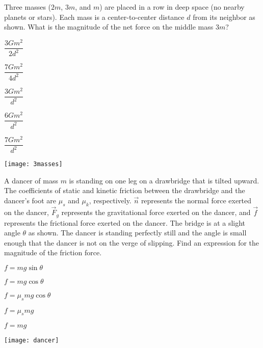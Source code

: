 \documentclass[11pt]{article}
\begin{document}
\begin{enumerate}
\begin{minipage}[t]{\lw}
\item Three masses ($2m$, $3m$, and $m$) are placed in a row in deep space (no nearby planets or stars). Each mass is a center-to-center distance $d$ from its neighbor as shown. What is the magnitude of the net force on the middle mass $3m$?\\
\begin{minipage}[t]{.5\lw}
\begin{choices}
\item $\dfrac{3Gm^2}{2d^2}$
\item $\dfrac{7Gm^2}{4d^2}$
\item $\dfrac{3Gm^2}{d^2}$
\item $\dfrac{6Gm^2}{d^2}$
\item $\dfrac{7Gm^2}{d^2}$
\end{choices}
\end{minipage}\hfill
\begin{minipage}[t]{.45\lw}
\vspace{0in}
\flushright
\texttt{[image: 3masses]}
\end{minipage}
\end{minipage}

\begin{minipage}[t]{\lw}
\item A dancer of mass $m$ is standing on one leg on a drawbridge that is tilted upward. The coefficients of static and kinetic friction between the drawbridge and the dancer's foot are $\mu_s$ and $\mu_k$, respectively. $\vec{n}$ represents the normal force exerted on the dancer, $\vec{F}_g$ represents the gravitational force exerted on the dancer, and $\vec{f}$ represents the frictional force exerted on the dancer. The bridge is at a slight angle $\theta$ as shown. The dancer is standing perfectly still and the angle is small enough that the dancer is not on the verge of slipping. Find an expression for the magnitude of the friction force.\\
\begin{minipage}[t]{.45\lw}
\begin{choices}
\item $f=mg\sin\theta$
\item $f=mg\cos\theta$
\item $f=\mu_smg\cos\theta$
\item $f=\mu_smg$
\item $f=mg$
\end{choices}
\end{minipage}\hfill
\begin{minipage}[t]{.5\lw}
\vspace{0in}
\flushright
\texttt{[image: dancer]}
\end{minipage}
\end{minipage}


\end{enumerate}
\end{document}
